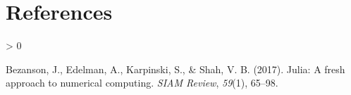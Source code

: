 \documentclass[
  notoc %
]{tufte-book}
\newlength{\cslhangindent}
\newenvironment{CSLReferences}[2] %
 {%
  \setlength{\parindent}{0pt}
  \ifodd #1 \everypar{\setlength{\hangindent}{\cslhangindent}}\ignorespaces\fi
  \ifnum #2 > 0
  \setlength{\parskip}{#2\baselineskip}
  \fi
 }%
 {}
\begin{document}
\hypertarget{references}{%
\chapter*{References}\label{references}}

\hypertarget{refs}{}
\begin{CSLReferences}{1}{0}
\leavevmode{}%
Bezanson, J., Edelman, A., Karpinski, S., \& Shah, V. B. (2017). Julia:
A fresh approach to numerical computing. \emph{SIAM Review},
\emph{59}(1), 65--98.

\end{CSLReferences}

\backmatter
\end{document}
